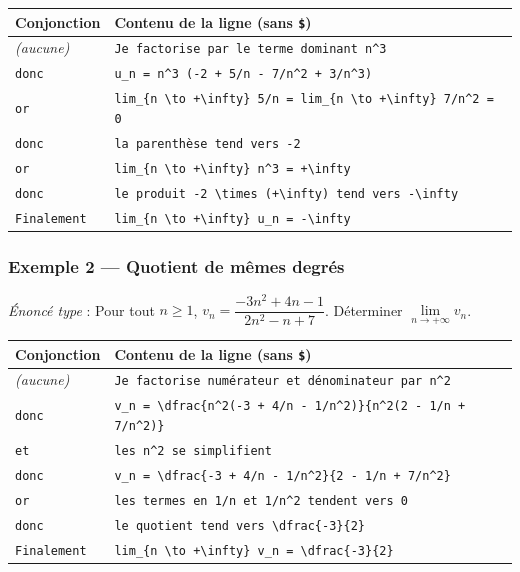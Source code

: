 \documentclass[11pt,a4paper]{article}
\begin{document}
\begin{center}
\footnotesize
\renewcommand{\arraystretch}{1.3}
\begin{tabular}{@{}p{2.4cm}p{11.8cm}@{}}
\toprule
\textbf{Conjonction} & \textbf{Contenu de la ligne (sans \texttt{\$})} \\
\midrule
\emph{(aucune)} & \verb|Je factorise par le terme dominant n^3| \\
\texttt{donc}   & \verb|u_n = n^3 (-2 + 5/n - 7/n^2 + 3/n^3)| \\
\texttt{or}     & \verb|lim_{n \to +\infty} 5/n = lim_{n \to +\infty} 7/n^2 = 0| \\
\texttt{donc}   & \verb|la parenthèse tend vers -2| \\
\texttt{or}     & \verb|lim_{n \to +\infty} n^3 = +\infty| \\
\texttt{donc}   & \verb|le produit -2 \times (+\infty) tend vers -\infty| \\
\texttt{Finalement} & \verb|lim_{n \to +\infty} u_n = -\infty| \\
\bottomrule
\end{tabular}
\end{center}

\subsubsection*{Exemple 2 — Quotient de mêmes degrés}

\emph{Énoncé type} : \og Pour tout \(n \geqslant 1\),
\(v_n = \dfrac{-3n^2 + 4n - 1}{2n^2 - n + 7}\). Déterminer
\(\lim\limits_{n \to +\infty} v_n\). \fg

\begin{center}
\footnotesize
\renewcommand{\arraystretch}{1.3}
\begin{tabular}{@{}p{2.4cm}p{11.8cm}@{}}
\toprule
\textbf{Conjonction} & \textbf{Contenu de la ligne (sans \texttt{\$})} \\
\midrule
\emph{(aucune)} & \verb|Je factorise numérateur et dénominateur par n^2| \\
\texttt{donc}   & \verb|v_n = \dfrac{n^2(-3 + 4/n - 1/n^2)}{n^2(2 - 1/n + 7/n^2)}| \\
\texttt{et}     & \verb|les n^2 se simplifient| \\
\texttt{donc}   & \verb|v_n = \dfrac{-3 + 4/n - 1/n^2}{2 - 1/n + 7/n^2}| \\
\texttt{or}     & \verb|les termes en 1/n et 1/n^2 tendent vers 0| \\
\texttt{donc}   & \verb|le quotient tend vers \dfrac{-3}{2}| \\
\texttt{Finalement} & \verb|lim_{n \to +\infty} v_n = \dfrac{-3}{2}| \\
\bottomrule
\end{tabular}
\end{center}
\end{document}
